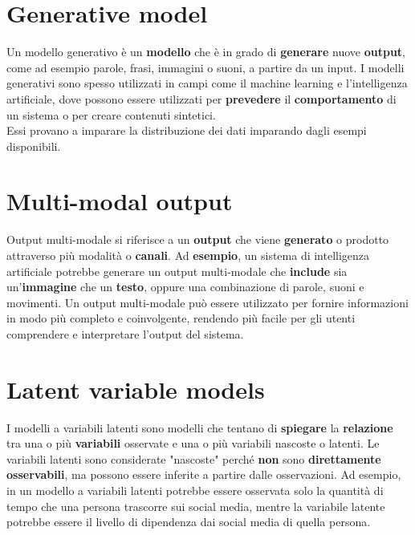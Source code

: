 \documentclass{article}
\begin{document}
\section{Generative model}
Un modello generativo è un \textbf{modello} che è in grado di \textbf{generare} nuove \textbf{output}, come ad esempio parole, frasi, immagini o suoni, a partire da un input. I modelli generativi sono spesso utilizzati in campi come il machine learning e l'intelligenza artificiale, dove possono essere utilizzati per \textbf{prevedere} il \textbf{comportamento} di un sistema o per creare contenuti sintetici.\\
Essi provano a imparare la distribuzione dei dati imparando dagli esempi disponibili.

\section{Multi-modal output}
Output multi-modale si riferisce a un \textbf{output} che viene \textbf{generato} o prodotto attraverso più modalità o \textbf{canali}. Ad \textbf{esempio}, un sistema di intelligenza artificiale potrebbe generare un output multi-modale che \textbf{include} sia un'\textbf{immagine} che un \textbf{testo}, oppure una combinazione di parole, suoni e movimenti. Un output multi-modale può essere utilizzato per fornire informazioni in modo più completo e coinvolgente, rendendo più facile per gli utenti comprendere e interpretare l'output del sistema.

\section{Latent variable models}
I modelli a variabili latenti sono modelli che tentano di \textbf{spiegare} la \textbf{relazione} tra una o più \textbf{variabili} osservate e una o più variabili nascoste o latenti. Le variabili latenti sono considerate "nascoste" perché \textbf{non} sono \textbf{direttamente} \textbf{osservabili}, ma possono essere inferite a partire dalle osservazioni. Ad esempio, in un modello a variabili latenti potrebbe essere osservata solo la quantità di tempo che una persona trascorre sui social media, mentre la variabile latente potrebbe essere il livello di dipendenza dai social media di quella persona.
\end{document}
